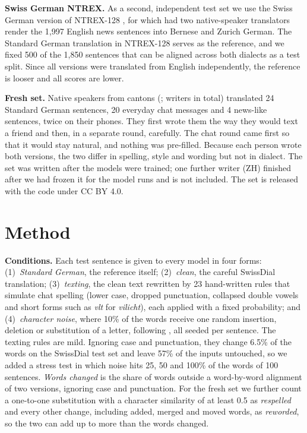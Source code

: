 \documentclass[11pt]{article}
\begin{document}
\textbf{Swiss German NTREX.} As a second, independent test set we use the Swiss German version of
NTREX-128 \citep{federmann2022ntrex}, for which \citet{aepli2023benchmark} had two
native-speaker translators render the 1,997 English news sentences into Bernese and Zurich German. The Standard
German translation in NTREX-128 serves as the reference, and we fixed 500 of the 1,850 sentences
that can be aligned across both dialects as a test split. Since all versions were translated from
English independently, the reference is looser and all scores are lower.

\textbf{Fresh set.} Native speakers from \FreshNCantons{} cantons (\FreshCantons; \FreshWriters{}
writers in total) translated 24 Standard German sentences, 20 everyday chat messages and 4 news-like
sentences, twice on their phones. They first wrote them the way they would text a friend and then,
in a separate round, carefully. The chat round came first so that it would stay natural, and nothing
was pre-filled. Because each person wrote both versions, the two differ in spelling, style and
wording but not in dialect. The set was written after the models were trained; one further writer
(ZH) finished after we had frozen it for the model runs and is not included. The set is
released with the code under CC BY 4.0.

\section{Method}

\textbf{Conditions.} Each test sentence is given to every model in four forms: (1)~\emph{Standard
German}, the reference itself; (2)~\emph{clean}, the careful SwissDial translation;
(3)~\emph{texting}, the clean text rewritten by 23 hand-written rules that simulate chat spelling
(lower case, dropped punctuation, collapsed double vowels and short forms such as \emph{vlt} for
\emph{vilicht}), each applied with a fixed probability; and (4)~\emph{character noise}, where 10\% of
the words receive one random insertion, deletion or substitution of a letter, following
\citet{aepli2022noise}, all seeded per sentence. The texting rules are mild. Ignoring case
and punctuation, they change 6.5\% of the words on the SwissDial test set and leave
57\% of the inputs untouched, so we added a stress test in which noise hits 25, 50 and 100\% of the
words of 100 sentences. \emph{Words changed} is the share of words outside a word-by-word alignment
of two versions, ignoring case and punctuation. For the fresh set we further count a one-to-one substitution with a character
similarity of at least 0.5 as \emph{respelled} and every other change, including added, merged and
moved words, as \emph{reworded}, so the two can add up to more than the words changed.
\end{document}

